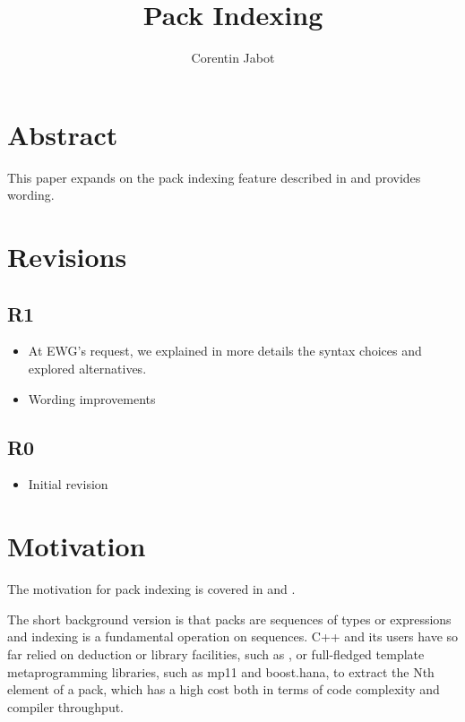 \documentclass{wg21}
\title{Pack Indexing}
\author{Corentin Jabot}{corentin.jabot@gmail.com}
\begin{document}
\maketitle

\section{Abstract}

This paper expands on the pack indexing feature described in  and provides wording.

\section{Revisions}


\subsection{R1}

\begin{itemize}
\item At EWG's request, we explained in more details the syntax choices and explored alternatives.
\item Wording improvements
\end{itemize}

\subsection{R0}

\begin{itemize}
\item{Initial revision}
\end{itemize}

\section{Motivation}

The motivation for pack indexing is covered in  and
 .

The short background version is that packs are sequences of types or expressions
and indexing is a fundamental operation on sequences.
C++ and its users have so far relied on deduction or library facilities, such as , or full-fledged template metaprogramming libraries, such as
mp11 and boost.hana, to extract the Nth element of a pack, which has a high cost both in terms of code complexity and compiler throughput.
\end{document}
